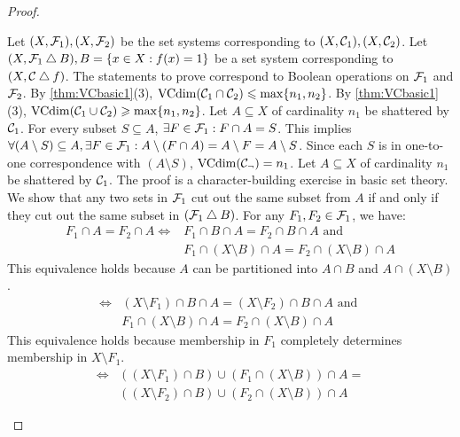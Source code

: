 \begin{proof}
\begin{outline}
\0 Let $(X,\mathcal{F}_1), (X,\mathcal{F}_2)$ be the set systems corresponding to $(X,\mathcal{C}_1),(X,\mathcal{C}_2)$. Let $(X,\mathcal{F}_1\bigtriangleup B), B=\{x\in X : f(x)=1\}$ be a set system corresponding to $(X,\mathcal{C}\bigtriangleup f)$. The statements to prove correspond to Boolean operations on $\mathcal{F}_1$ and $\mathcal{F}_2$.  
    \1[(1)] By \cref{thm:VCbasic1}(3), $\operatorname{VCdim}(\mathcal{C}_1\cap \mathcal{C}_2) \leqslant \max \{n_1,n_2\}$. 
    \1[(2)] By \cref{thm:VCbasic1}(3), $\operatorname{VCdim}(\mathcal{C}_1\cup \mathcal{C}_2) \geqslant \max \{n_1,n_2\}$.
    \1[(3)] Let $A\subseteq X$ of cardinality $n_1$ be shattered by $\mathcal{C}_1$. For every subset $S\subseteq A$, $\exists F\in \mathcal{F}_1 : F\cap A = S$. This implies $\forall (A\setminus S)\subseteq A, \exists F \in \mathcal{F}_1 : A \setminus (F\cap A) = A\setminus F = A\setminus S$. Since each $S$ is in one-to-one correspondence with $(A\setminus S)$, $\operatorname{VCdim}(\mathcal{C}_\lnot) = n_1$.
    \1[(4)] Let $A\subseteq X$ of cardinality $n_1$ be shattered by $\mathcal{C}_1$. The proof is a character-building exercise in basic set theory. We show that any two sets in $\mathcal{F}_1$ cut out the same subset from $A$ if and only if they cut out the same subset in $(\mathcal{F}_1\bigtriangleup B)$.
        \2 For any $F_1,F_2 \in \mathcal{F}_1$, we have:
        \begin{align*}
            F_1 \cap A = F_2 \cap A 
            \iff & F_1 \cap B \cap A = F_2 \cap B \cap A \text{ and } \\
            & F_1\cap (X\setminus B)\cap A = F_2\cap (X\setminus B)\cap A
        \end{align*}
        This equivalence holds because $A$ can be partitioned into $A\cap B$ and $A\cap (X\setminus B)$.
        \begin{align*}
            \iff & (X\setminus F_1) \cap B \cap A = (X\setminus F_2) \cap B \cap A \text{ and } \\
            & F_1 \cap (X\setminus B) \cap A = F_2 \cap (X\setminus B) \cap A
        \end{align*}
        This equivalence holds because membership in $F_1$ completely determines membership in $X\setminus F_1$.
        \begin{align*}
            \iff & 
            \left((X\setminus F_1)\cap B\right) \cup \left(F_1\cap (X\setminus B)\right) \cap A = \\
            & \left((X\setminus F_2)\cap B\right) \cup \left(F_2\cap (X\setminus B)\right) \cap A
        \end{align*}

\end{outline}
\end{proof}

